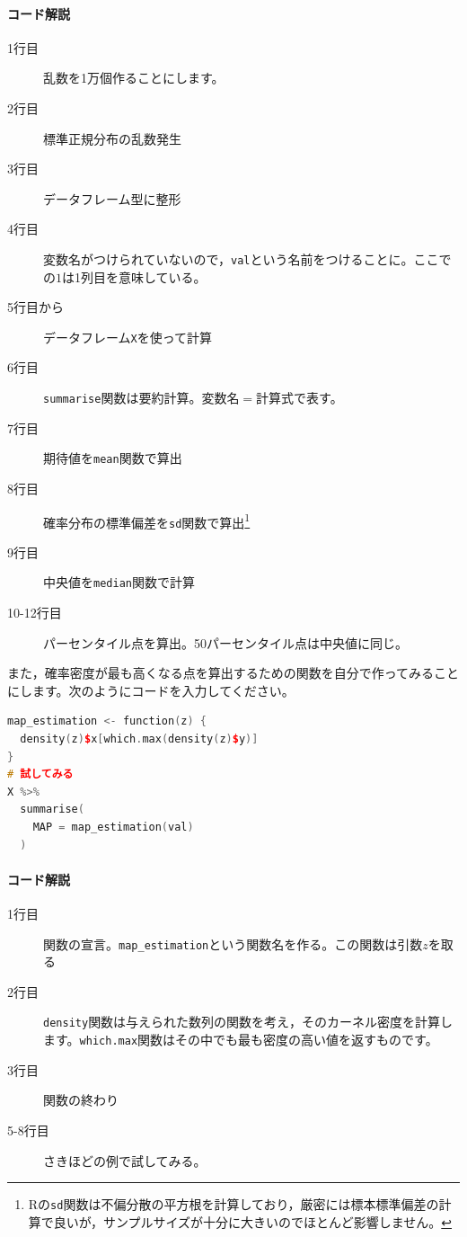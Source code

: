\documentclass{ltjsbook}
\begin{document}
\paragraph{コード解説}
\begin{description}
	\item[1行目] 乱数を1万個作ることにします。
	\item[2行目] 標準正規分布の乱数発生
	\item[3行目] データフレーム型に整形
	\item[4行目] 変数名がつけられていないので，\texttt{val}という名前をつけることに。ここでの$1$は1列目を意味している。
	\item[5行目から] データフレーム\texttt{X}を使って計算
	\item[6行目] \texttt{summarise}関数は要約計算。変数名$=$計算式で表す。
	\item[7行目] 期待値を\texttt{mean}関数で算出
	\item[8行目] 確率分布の標準偏差を\texttt{sd}関数で算出\footnote{Rの\texttt{sd}関数は不偏分散の平方根を計算しており，厳密には標本標準偏差の計算で良いが，サンプルサイズが十分に大きいのでほとんど影響しません。}
	\item[9行目] 中央値を\texttt{median}関数で計算
	\item[10-12行目] パーセンタイル点を算出。50パーセンタイル点は中央値に同じ。
\end{description}

また，確率密度が最も高くなる点を算出するための関数を自分で作ってみることにします。次のようにコードを入力してください。
\begin{lstlisting}[language=c++,label={code:03_07},caption={確率分布の要約}]
map_estimation <- function(z) {
  density(z)$x[which.max(density(z)$y)]
}
# 試してみる
X %>%
  summarise(
    MAP = map_estimation(val)
  )

\end{lstlisting}
\paragraph{コード解説}
\begin{description}
	\item[1行目] 関数の宣言。\verb|map_estimation|という関数名を作る。この関数は引数$z$を取る
	\item[2行目] \texttt{density}関数は与えられた数列の関数を考え，そのカーネル密度を計算します。\texttt{which.max}関数はその中でも最も密度の高い値を返すものです。
	\item[3行目] 関数の終わり
	\item[5-8行目] さきほどの例で試してみる。
\end{description}
\end{document}
